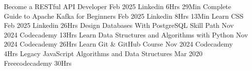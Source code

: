 
\begin{envcvcerts}
  \cvcerts
    {Become a RESTful API Developer}
    {Feb 2025}
    {Linkedin}
    {6Hrs 29Min}
  \cvcerts
    {Complete Guide to Apache Kafka for Beginners}
    {Feb 2025}
    {Linkedin}
    {8Hrs 13Min}
  \cvcerts
    {Learn CSS}
    {Feb 2025}
    {Linkedin}
    {26Hrs}
  \cvcerts
    {Design Databases With PostgreSQL Skill Path}
    {Nov 2024}
    {Codecademy}
    {13Hrs}
  \cvcerts
    {Learn Data Structures and Algorithms with Python}
    {Nov 2024}
    {Codecademy}
    {26Hrs}
  \cvcerts
    {Learn Git \& GitHub Course}
    {Nov 2024}
    {Codecademy}
    {4Hrs}
  \cvcerts
    {Legacy JavaScript Algorithms and Data Structures}
    {Mar 2020}
    {Freecodecademy}
    {30Hrs}
\end{envcvcerts}
